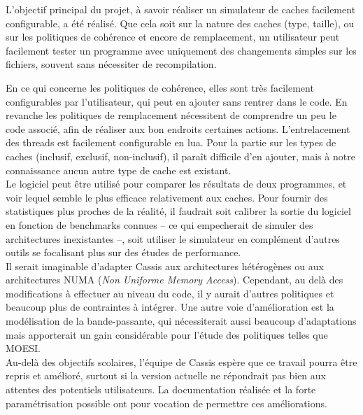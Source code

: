 L'objectif principal du projet, à savoir réaliser un simulateur de caches facilement configurable, a été réalisé. Que cela soit sur la nature des caches (type, taille), ou sur les politiques de cohérence et encore de remplacement, un utilisateur peut facilement tester un programme avec uniquement des changements simples sur les fichiers, souvent sans nécessiter de recompilation.

En ce qui concerne les politiques de cohérence, elles sont très facilement configurables par l'utilisateur, qui peut en ajouter sans rentrer dans le code. En revanche les politiques de remplacement nécessitent de comprendre un peu le code associé, afin de réaliser aux bon endroits certaines actions. L'entrelacement des threads est facilement configurable en lua. Pour la partie sur les types de caches (inclusif, exclusif, non-inclusif), il paraît difficile d'en ajouter, mais à notre connaissance aucun autre type de cache est existant.\\

Le logiciel peut être utilisé pour comparer les résultats de deux programmes, et voir lequel semble le plus efficace relativement aux caches. Pour fournir des statistiques plus proches de la réalité, il faudrait soit calibrer la sortie du logiciel en fonction de benchmarks connues -- ce qui empecherait de simuler des architectures inexistantes --, soit utiliser le simulateur en complément d'autres outils se focalisant plus sur des études de performance.\\

Il serait imaginable d'adapter \textsf{Cassis} aux architectures hétérogènes ou aux architectures NUMA (\emph{Non Uniforme Memory Access}). Cependant, au delà des modifications à effectuer au niveau du code, il y aurait d'autres politiques et beaucoup plus de contraintes à intégrer. Une autre voie d'amélioration est la modélisation de la bande-passante, qui nécessiterait aussi beaucoup d'adaptations mais apporterait un gain considérable pour l'étude des politiques telles que MOESI.\\

Au-delà des objectifs scolaires, l'équipe de \textsf{Cassis} espère que ce travail pourra être repris et amélioré, surtout si la version actuelle ne répondrait pas bien aux attentes des potentiels utilisateurs. La documentation réalisée et la forte paramétrisation possible ont pour vocation de permettre ces améliorations.


